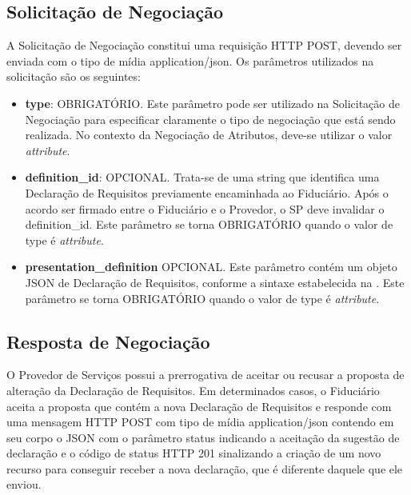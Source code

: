 \subsection{Solicitação de Negociação}\label{subsection:negotiation-request}

A Solicitação de Negociação constitui uma requisição HTTP POST, devendo ser enviada com o tipo de mídia application/json. Os parâmetros utilizados na solicitação são os seguintes:



\begin{itemize}

    \item \textbf{type}: OBRIGATÓRIO. Este parâmetro pode ser utilizado na Solicitação de Negociação para especificar claramente o tipo de negociação que está sendo realizada. No contexto da Negociação de Atributos, deve-se utilizar o valor \textit{attribute}.

    \item \textbf{definition\_id}: OPCIONAL. Trata-se de uma string que identifica uma Declaração de Requisitos previamente encaminhada ao Fiduciário. Após o acordo ser firmado entre o Fiduciário e o Provedor, o \acs{SP} deve invalidar o definition\_id. Este parâmetro se torna OBRIGATÓRIO quando o valor de type é \textit{attribute}.
    
    \item \textbf{presentation\_definition} OPCIONAL. Este parâmetro contém um objeto JSON de Declaração de Requisitos, conforme a sintaxe estabelecida na \cite{presentation-exchange}. Este parâmetro se torna OBRIGATÓRIO quando o valor de type é \textit{attribute}.
    
\end{itemize}

\subsection{Resposta de Negociação}

O Provedor de Serviços possui a prerrogativa de aceitar ou recusar a proposta de alteração da Declaração de Requisitos. Em determinados casos, o Fiduciário aceita a proposta que contém a nova Declaração de Requisitos e responde com uma mensagem HTTP POST com tipo de mídia application/json contendo em seu corpo o \acs{JSON} com o parâmetro status indicando a aceitação da sugestão de declaração e o código de status HTTP 201 sinalizando a criação de um novo recurso para conseguir receber a nova declaração, que é diferente daquele que ele enviou. 


